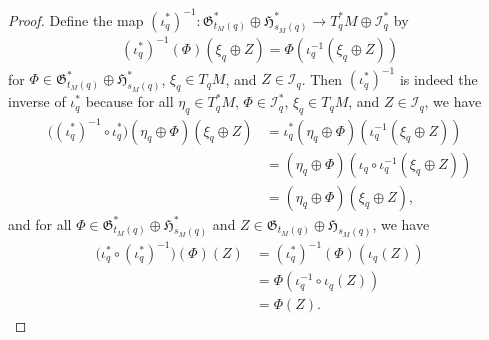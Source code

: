 \documentclass[10pt,a4paper]{amsart}
\begin{document}
\begin{proof}
    Define the map $(\iota^*_q)^{-1}: \mathfrak{G}_{t_M(q)}^*\oplus \mathfrak{H}_{s_M(q)}^*\to T^*_qM\oplus\mathcal{I}_q^*$ by
    \begin{align}
        (\iota^*_q)^{-1}(\Phi)(\xi_q\oplus Z) = \Phi(\iota_q^{-1}(\xi_q\oplus Z))
    \end{align}
for $\Phi\in \mathfrak{G}_{t_M(q)}^*\oplus \mathfrak{H}_{s_M(q)}^*$, $\xi_q\in T_qM$, and $Z\in \mathcal{I}_q$.  Then $(\iota_q^*)^{-1}$ is indeed the inverse of $\iota_q^*$ because for all $\eta_q\in T_q^*M$, $\Phi\in \mathcal{I}_q^*$, $\xi_q\in T_qM$, and $Z\in \mathcal{I}_q$, we have
\begin{align}
    \big((\iota_q^*)^{-1}\circ\iota_q^*\big)(\eta_q\oplus\Phi)(\xi_q\oplus Z) &= \iota_q^*(\eta_q\oplus \Phi)(\iota_q^{-1}(\xi_q\oplus Z))\\
    &= (\eta_q\oplus \Phi)(\iota_q\circ\iota_q^{-1}(\xi_q\oplus Z))\\
    &=(\eta_q\oplus \Phi)(\xi_q\oplus Z),
\end{align}
and for all $\Phi\in \mathfrak{G}_{t_M(q)}^*\oplus \mathfrak{H}_{s_M(q)}^*$ and $Z\in \mathfrak{G}_{t_M(q)}\oplus\mathfrak{H}_{s_M(q)}$, we have
\begin{align}
    \big(\iota^*_q\circ(\iota_q^*)^{-1}\big)(\Phi)(Z) &= (\iota_q^*)^{-1}(\Phi)(\iota_q(Z))\\
    &= \Phi(\iota_q^{-1}\circ\iota_q(Z))\\
    &= \Phi(Z).
\end{align}

\end{proof}
\end{document}
